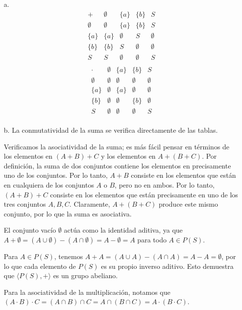 \begin{enumerate}
	\begin{enumerate}
		\item[a.]
		\[
		\begin{array}{c|cccc}
			+ & \emptyset & \{a\} & \{b\} & S \\
			\hline
			\emptyset & \emptyset & \{a\} & \{b\} & S \\
			\{a\} & \{a\} & \emptyset & S & \emptyset \\
			\{b\} & \{b\} & S & \emptyset & \emptyset \\
			S & S & \emptyset & \emptyset & S \\
		\end{array}
		\]
		\[
		\begin{array}{c|cccc}
			\cdot & \emptyset & \{a\} & \{b\} & S \\
			\hline
			\emptyset & \emptyset & \emptyset & \emptyset & \emptyset \\
			\{a\} & \emptyset & \{a\} & \emptyset & \emptyset \\
			\{b\} & \emptyset & \emptyset & \{b\} & \emptyset \\
			S & \emptyset & \emptyset & \emptyset & S \\
		\end{array}
		\]
		
		\item[b.] La conmutatividad de la suma se verifica directamente de las tablas.
		
		Verificamos la asociatividad de la suma; es más fácil pensar en términos de los elementos en $(A + B) + C$ y los elementos en $A + (B + C)$. Por definición, la suma de dos conjuntos contiene los elementos en precisamente uno de los conjuntos. Por lo tanto, $A + B$ consiste en los elementos que están en cualquiera de los conjuntos $A$ o $B$, pero no en ambos. Por lo tanto, $(A + B) + C$ consiste en los elementos que están precisamente en uno de los tres conjuntos $A, B, C$. Claramente, $A + (B + C)$ produce este mismo conjunto, por lo que la suma es asociativa.
		
		El conjunto vacío $\emptyset$ actúa como la identidad aditiva, ya que $A + \emptyset = (A \cup \emptyset) - (A \cap \emptyset) = A - \emptyset = A$ para todo $A \in P(S)$.
		
		Para $A \in P(S)$, tenemos $A + A = (A \cup A) - (A \cap A) = A - A = \emptyset$, por lo que cada elemento de $P(S)$ es su propio inverso aditivo. Esto demuestra que $\langle P(S), + \rangle$ es un grupo abeliano.
		
		Para la asociatividad de la multiplicación, notamos que $(A \cdot B) \cdot C = (A \cap B) \cap C = A \cap (B \cap C) = A \cdot (B \cdot C)$.
		

\end{enumerate}
\end{enumerate}

